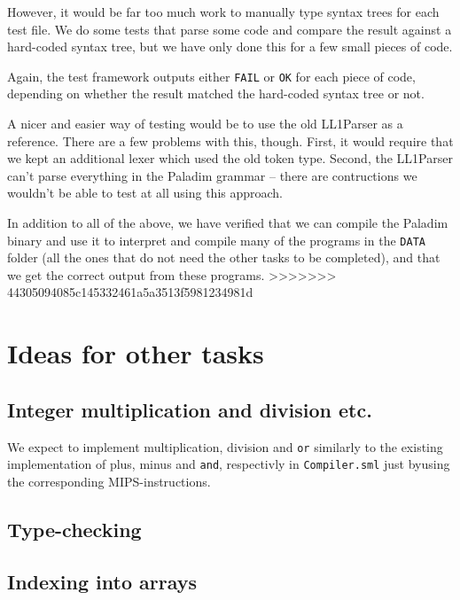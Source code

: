 \documentclass{article}
\begin{document}
However, it would be far too much work to manually type syntax trees for each test file. We do
some tests that parse some code and compare the result against a hard-coded syntax tree, but
we have only done this for a few small pieces of code.

Again, the test framework outputs either \texttt{FAIL} or \texttt{OK} for each piece of code,
depending on whether the result matched the hard-coded syntax tree or not.

A nicer and easier way of testing would be to use the old LL1Parser as a reference. There are
a few problems with this, though. First, it would require that we kept an additional lexer
which used the old token type. Second, the LL1Parser can't parse everything in the Paladim
grammar -- there are contructions we wouldn't be able to test at all using this approach.

In addition to all of the above, we have verified that we can compile the Paladim binary and
use it to interpret and compile many of the programs in the \texttt{DATA} folder (all the
ones that do not need the other tasks to be completed), and that we get the correct output
from these programs.
>>>>>>> 44305094085c145332461a5a3513f5981234981d

\section{Ideas for other tasks}
\subsection{Integer multiplication and division etc.}
We expect to implement multiplication, division and \texttt{or} similarly to the existing implementation of plus, minus and \texttt{and}, respectivly in \texttt{Compiler.sml} just byusing the corresponding MIPS-instructions.
\subsection{Type-checking}

\subsection{Indexing into arrays}
\end{document}
